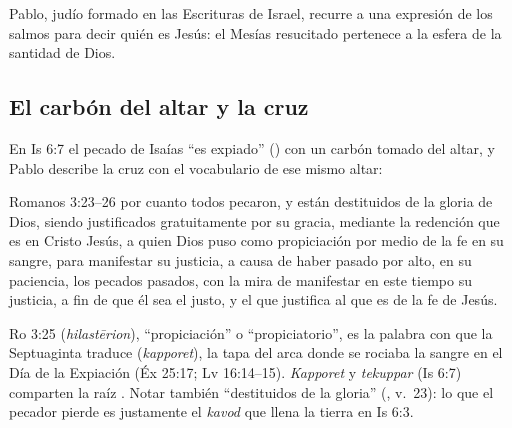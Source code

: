 Pablo, judío formado en las Escrituras de Israel, recurre a una expresión de los salmos para decir quién es Jesús: el Mesías resucitado pertenece a la esfera de la santidad de Dios.


\subsection{El carbón del altar y la cruz}
En Is 6:7 el pecado de Isaías ``es expiado'' () con un carbón tomado del altar, y Pablo describe la cruz con el vocabulario de ese mismo altar:

\begin{verso}{Romanos 3:23–26}
por cuanto todos pecaron, y están destituidos de la gloria de Dios, siendo justificados gratuitamente por su gracia, mediante la redención que es en Cristo Jesús, a quien Dios puso como propiciación por medio de la fe en su sangre, para manifestar su justicia, a causa de haber pasado por alto, en su paciencia, los pecados pasados, con la mira de manifestar en este tiempo su justicia, a fin de que él sea el justo, y el que justifica al que es de la fe de Jesús.
\end{verso}

\begin{filologiatexto}{Ro 3:25}
 (\emph{hilastērion}), ``propiciación'' o ``propiciatorio'', es la palabra con que la Septuaginta traduce  (\emph{kapporet}), la tapa del arca donde se rociaba la sangre en el Día de la Expiación (Éx 25:17; Lv 16:14--15). \emph{Kapporet} y \emph{tekuppar} (Is 6:7) comparten la raíz . Notar también ``destituidos de la gloria'' (, v.~23): lo que el pecador pierde es justamente el \emph{kavod} que llena la tierra en Is 6:3.
\end{filologiatexto}

